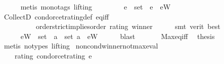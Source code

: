 \begin{isabellebody}
\ \ \ \ \isamarkupfalse%
\ {\isacharparenleft}{\kern0pt}metis\ {\isacharparenleft}{\kern0pt}mono{\isacharunderscore}{\kern0pt}tags{\isacharcomma}{\kern0pt}\ lifting{\isacharparenright}{\kern0pt}{\isacharparenright}{\kern0pt}\isanewline
\ \ \isanewline
\ \ \isamarkupfalse%
\ {}{\isacharcolon}{\kern0pt}\ {\isachardoublequoteopen}{\isasymforall}\ e\ {\isasymin}\ {\isacharquery}{\kern0pt}set\ {\isachardot}{\kern0pt}\ e\ {\isasymle}\ {\isacharquery}{\kern0pt}eW{\isachardoublequoteclose}\isanewline
\ \ \ \ \isamarkupfalse%
\ CollectD\ condorcet{\isacharunderscore}{\kern0pt}rating{\isacharunderscore}{\kern0pt}def\ eq{\isacharunderscore}{\kern0pt}iff\isanewline
\ \ \ \ \ \ \ \ \ \ order{\isachardot}{\kern0pt}strict{\isacharunderscore}{\kern0pt}implies{\isacharunderscore}{\kern0pt}order\ rating\ winner\isanewline
\ \ \ \ \isamarkupfalse%
\ {\isacharparenleft}{\kern0pt}smt\ {\isacharparenleft}{\kern0pt}verit{\isacharcomma}{\kern0pt}\ best{\isacharparenright}{\kern0pt}{\isacharparenright}{\kern0pt}\isanewline
\ \ \isanewline
\ \ \isamarkupfalse%
\ {}\ {}\ \isamarkupfalse%
\ {}{\isacharcolon}{\kern0pt}\isanewline
\ \ \ \ {\isachardoublequoteopen}{\isacharquery}{\kern0pt}eW\ {\isasymin}\ {\isacharquery}{\kern0pt}set\ {\isasymand}\ {\isacharparenleft}{\kern0pt}{\isasymforall}a\ {\isasymin}\ {\isacharquery}{\kern0pt}set{\isachardot}{\kern0pt}\ a\ {\isasymle}\ {\isacharquery}{\kern0pt}eW{\isacharparenright}{\kern0pt}{\isachardoublequoteclose}\isanewline
\ \ \ \ \isamarkupfalse%
\ blast\isanewline
\ \ \isamarkupfalse%
\ {}\ {}\ {}\ Max{\isacharunderscore}{\kern0pt}eq{\isacharunderscore}{\kern0pt}iff\ \isamarkupfalse%
\ {\isacharquery}{\kern0pt}thesis\isanewline
\ \ \ \ \isamarkupfalse%
\ {\isacharparenleft}{\kern0pt}metis\ {\isacharparenleft}{\kern0pt}no{\isacharunderscore}{\kern0pt}types{\isacharcomma}{\kern0pt}\ lifting{\isacharparenright}{\kern0pt}{\isacharparenright}{\kern0pt}\isanewline
{}\isamarkupfalse%
%
\endisatagproof
{\isafoldproof}%
%
\isadelimproof
\isanewline
%
\endisadelimproof
\isanewline
\isanewline
{}\isamarkupfalse%
\ non{\isacharunderscore}{\kern0pt}cond{\isacharunderscore}{\kern0pt}winner{\isacharunderscore}{\kern0pt}not{\isacharunderscore}{\kern0pt}max{\isacharunderscore}{\kern0pt}eval{\isacharcolon}{\kern0pt}\isanewline
\ \ \isanewline
\ \ \ \ rating{\isacharcolon}{\kern0pt}\ {\isachardoublequoteopen}condorcet{\isacharunderscore}{\kern0pt}rating\ e{\isachardoublequoteclose}\ \isanewline

\end{isabellebody}
